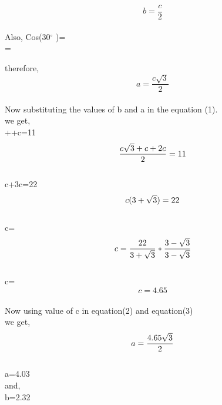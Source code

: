 \documentclass[a4paper,12pt]{article}
\begin{document}
\begin{multicols}{2}
\begin{equation}
  b=\dfrac{c}{2}  
\end{equation}\\


Also,
Cos(30$^{\circ}$ )= \\

=\\

\setlength{\columnsep}{1.5cm}
\setlength{\columnseprule}{0.2pt}

therefore,\\
\begin{equation}
    a=\dfrac{c\sqrt{3}}{2}
\end{equation}\\

Now substituting the values of b and a in the equation (1).\\
we get,\\

++c=11\\$$\\
\dfrac{c\sqrt{3}+c+2c}{2}=11\\$$\\

c+3c=22\\$$\\
c(3+\sqrt{3})=22\\$$\\

c= \\$$\\
c= \dfrac{22}{3+\sqrt{3}}* \dfrac{3-\sqrt{3}}{3-\sqrt{3}}\\$$\\

c=\\

\begin{equation}
    c=4.65
\end{equation}\\

Now using value of c in equation(2) and equation(3)\\
we get,\\$$\\
a=\dfrac{4.65\sqrt{3}}{2}\\$$\\
a=4.03 \\
and,\\
b=2.32\\


\end{multicols}
\end{document}
